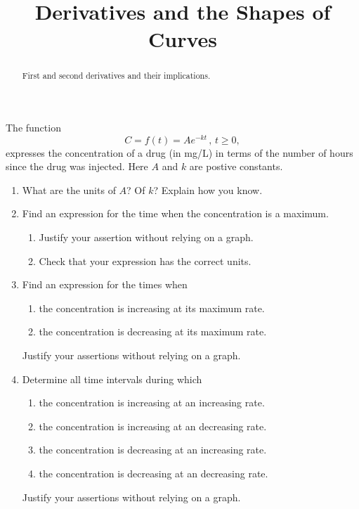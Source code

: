 \documentclass{ximera}
\title{Derivatives and the Shapes of Curves}
\begin{document}
\begin{abstract}
First and second derivatives and their implications.
\end{abstract}
\maketitle


\begin{question}  \label{Q56hnnhfgh}
The function
\[
      C = f(t) = A e^{-kt} \, , \, t\geq 0 ,
\]
expresses the concentration of a drug (in mg/L) in terms of the number of hours since the drug was injected. Here $A$ and $k$ are postive constants.

\begin{enumerate}
\item What are the units of $A$? Of $k$? Explain how you know.



\item Find an expression for the time when the concentration is a maximum.

\begin{enumerate}
\item Justify your assertion without relying on a graph.

\item Check that your expression has the correct units.
\end{enumerate}

\item Find an expression for the times when
\begin{enumerate}
\item the concentration is increasing at its maximum rate.

\item the concentration is decreasing at its maximum rate.

\end{enumerate}
Justify your assertions without relying on a graph.


\item Determine all time intervals during which 

\begin{enumerate}
\item the concentration is increasing at an increasing rate.

\item the concentration is increasing at an decreasing rate.

\item the concentration is decreasing at an increasing rate.

\item the concentration is decreasing at an decreasing rate.

\end{enumerate}
Justify your assertions without relying on a graph.
\end{enumerate}
\end{question}
\end{document}
